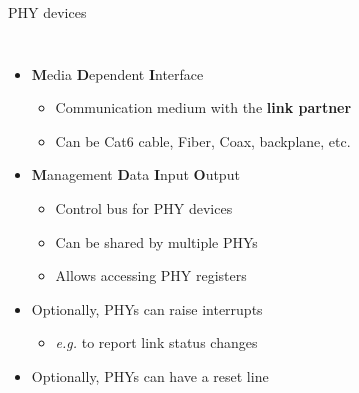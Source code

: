 \begin{frame}{PHY devices}
\begin{columns}
\begin{itemize}
			\item \textbf{M}edia \textbf{D}ependent \textbf{I}nterface
				\begin{itemize}
					\item Communication medium with the \textbf{link partner}
					\item Can be Cat6 cable, Fiber, Coax, backplane, etc.
				\end{itemize}
			\item \textbf{M}anagement \textbf{D}ata \textbf{I}nput \textbf{O}utput
				\begin{itemize}
					\item Control bus for PHY devices
					\item Can be shared by multiple PHYs
					\item Allows accessing PHY registers
				\end{itemize}
			\item Optionally, PHYs can raise interrupts
				\begin{itemize}
					\item \textit{e.g.} to report link status changes
				\end{itemize}
			\item Optionally, PHYs can have a reset line


		\end{itemize}
	\end{columns}
\end{frame}

